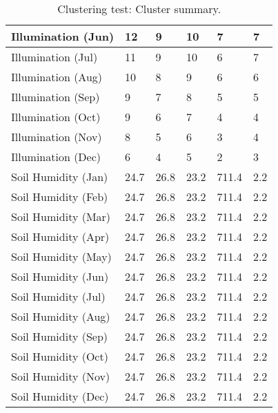 \begin{table}[]
\begin{tabular}{|p{5cm}|p{2cm}|p{2cm}|p{2cm}|p{2cm}|p{2cm}|}
		\hline
		Illumination (Jun) & 12 & 9 & 10 & 7 & 7 \\
		\hline
		Illumination (Jul) & 11 & 9 & 10 & 6 & 7 \\
		\hline
		Illumination (Aug) & 10 & 8 & 9 & 6 & 6 \\
		\hline
		Illumination (Sep) & 9 & 7 & 8 & 5 & 5 \\
		\hline
		Illumination (Oct) & 9 & 6 & 7 & 4 & 4 \\
		\hline
		Illumination (Nov) & 8 & 5 & 6 & 3 & 4 \\
		\hline
		Illumination (Dec) & 6 & 4 & 5 & 2 & 3 \\
		\hline
  	    Soil Humidity (Jan) & 24.7 & 26.8 & 23.2 & 711.4 & 2.2 \\
		\hline
  	    Soil Humidity (Feb) & 24.7 & 26.8 & 23.2 & 711.4 & 2.2 \\
		\hline
  	    Soil Humidity (Mar) & 24.7 & 26.8 & 23.2 & 711.4 & 2.2 \\
		\hline
  	    Soil Humidity (Apr) & 24.7 & 26.8 & 23.2 & 711.4 & 2.2 \\
		\hline
  	    Soil Humidity (May) & 24.7 & 26.8 & 23.2 & 711.4 & 2.2 \\
		\hline
  	    Soil Humidity (Jun) & 24.7 & 26.8 & 23.2 & 711.4 & 2.2 \\
		\hline
  	    Soil Humidity (Jul) & 24.7 & 26.8 & 23.2 & 711.4 & 2.2 \\
		\hline
  	    Soil Humidity (Aug) & 24.7 & 26.8 & 23.2 & 711.4 & 2.2 \\
		\hline
  	    Soil Humidity (Sep) & 24.7 & 26.8 & 23.2 & 711.4 & 2.2 \\
		\hline
  	    Soil Humidity (Oct) & 24.7 & 26.8 & 23.2 & 711.4 & 2.2 \\
		\hline
  	    Soil Humidity (Nov) & 24.7 & 26.8 & 23.2 & 711.4 & 2.2 \\
		\hline
  	    Soil Humidity (Dec) & 24.7 & 26.8 & 23.2 & 711.4 & 2.2 \\
		\hline
		\end{tabular}
		\caption{Clustering test: Cluster summary.}
	  \label{tab:clustering_test_resulting_clusters}
\end{table}